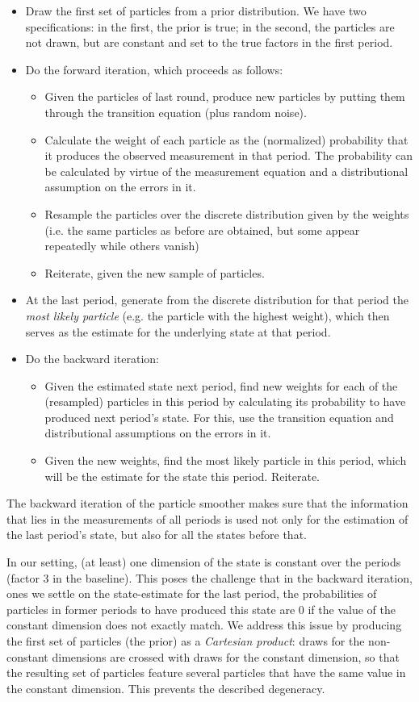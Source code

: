 \documentclass[11pt, a4paper, leqno]{article}
\begin{document}
\begin{itemize}
	\item Draw the first set of particles from a prior distribution. We have two specifications: in the first, the prior is true; in the second, the particles are not drawn, but are constant and set to the true factors in the first period.
	\item Do the forward iteration, which proceeds as follows:
	\begin{itemize}
		\item Given the particles of last round, produce new particles by putting them through the transition equation (plus random noise).
		\item Calculate the weight of each particle as the (normalized) probability that it produces the observed measurement in that period. The probability can be calculated by virtue of the measurement equation and a distributional assumption on the errors in it.
		\item Resample the particles over the discrete distribution given by the weights (i.e. the same particles as before are obtained, but some appear repeatedly while others vanish)
		\item Reiterate, given the new sample of particles.
	\end{itemize}
	\item At the last period, generate from the discrete distribution for that period the \textit{most likely particle} (e.g. the particle with the highest weight), which then serves as the estimate for the underlying state at that period.
	\item Do the backward iteration:
	\begin{itemize}
		\item Given the estimated state next period, find new weights for each of the (resampled) particles in this period by calculating its probability to have produced next period's state. For this, use the transition equation and distributional assumptions on the errors in it.
		\item Given the new weights, find the most likely particle in this period, which will be the estimate for the state this period. Reiterate.
	\end{itemize}
\end{itemize}
The backward iteration of the particle smoother makes sure that the information that lies in the measurements of all periods is used not only for the estimation of the last period's state, but also for all the states before that.\par
In our setting, (at least) one dimension of the state is constant over the periods (factor 3 in the baseline). This poses the challenge that in the backward iteration, ones we settle on the state-estimate for the last period, the probabilities of particles in former periods to have produced this state are 0 if the value of the constant dimension does not exactly match. We address this issue by producing the first set of particles (the prior) as a \textit{Cartesian product}: draws for the non-constant dimensions are crossed with draws for the constant dimension, so that the resulting set of particles feature several particles that have the same value in the constant dimension. This prevents the described degeneracy.
\end{document}
